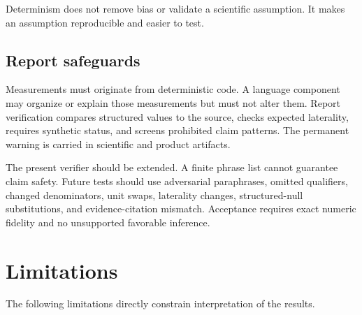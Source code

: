 \documentclass[11pt]{article}
\begin{document}
Determinism does not remove bias or validate a scientific assumption. It makes an assumption reproducible and easier to test.

\subsection{Report safeguards}

Measurements must originate from deterministic code. A language component may organize or explain those measurements but must not alter them. Report verification compares structured values to the source, checks expected laterality, requires synthetic status, and screens prohibited claim patterns. The permanent warning is carried in scientific and product artifacts.

The present verifier should be extended. A finite phrase list cannot guarantee claim safety. Future tests should use adversarial paraphrases, omitted qualifiers, changed denominators, unit swaps, laterality changes, structured-null substitutions, and evidence-citation mismatch. Acceptance requires exact numeric fidelity and no unsupported favorable inference.

\section{Limitations}

The following limitations directly constrain interpretation of the results.
\end{document}
